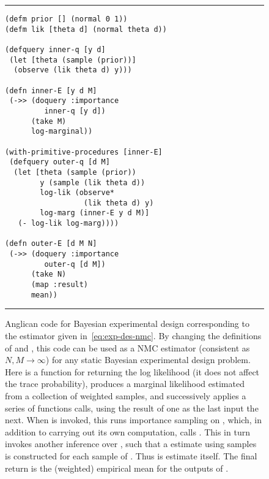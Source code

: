 \begin{figure}[t]
			\centering	
			\vspace{-10pt}		
			\rule{\linewidth}{0.4pt}
			\vspace{-28pt}		
	\begin{lstlisting}[basicstyle=\ttfamily\footnotesize,multicols=2,frame=none]
(defm prior [] (normal 0 1))
(defm lik [theta d] (normal theta d))

(defquery inner-q [y d]
 (let [theta (sample (prior))]
  (observe (lik theta d) y)))

(defn inner-E [y d M]
 (->> (doquery :importance 
         inner-q [y d])
      (take M)
      log-marginal))
      
(with-primitive-procedures [inner-E]
 (defquery outer-q [d M]
  (let [theta (sample (prior))
        y (sample (lik theta d))
        log-lik (observe* 
                  (lik theta d) y)
        log-marg (inner-E y d M)]
   (- log-lik log-marg))))

(defn outer-E [d M N]
 (->> (doquery :importance 
         outer-q [d M])
      (take N)
      (map :result)
      mean))
	\end{lstlisting}
	\vspace{-20pt}		
	\rule{\linewidth}{0.4pt}
	\caption{Anglican code for Bayesian experimental design corresponding to the estimator
		given in~\eqref{eq:exp-des-nmc}.  By changing the definitions of 
		 and , this code can be used as a
		 NMC estimator (consistent as $N,M\rightarrow\infty$) for any static
		 Bayesian experimental design problem.
		 Here  is a function for returning the log likelihood (it does not
		 affect the trace probability),  produces a marginal likelihood estimated
		 from a collection of weighted samples,
		 and \lsi{->>} successively applies a series of functions calls,
		 using the result of one as the last input the next.  When  is invoked,
		 this runs importance sampling on , which, in addition to carrying out
		 its own computation, calls .  This in turn invokes another inference over
		 , such that a \mc estimate using  samples is constructed for
		 each sample of .  Thus  is \mc estimate itself.
		 The final return is the (weighted) empirical mean for
		 the outputs of .
	\label{fig:nest:exp}}
\vspace{-5pt}
\end{figure}

